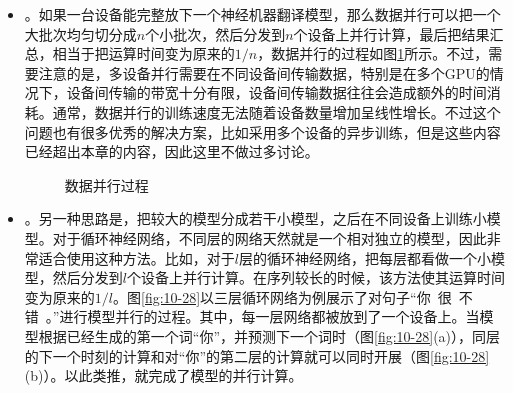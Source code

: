 \begin{itemize}
\vspace{0.5em}

\item {\small{}}。如果一台设备能完整放下一个神经机器翻译模型，那么数据并行可以把一个大批次均匀切分成$n$个小批次，然后分发到$n$个设备上并行计算，最后把结果汇总，相当于把运算时间变为原来的${1}/{n}$，数据并行的过程如图\ref{fig:10-27}所示。不过，需要注意的是，多设备并行需要在不同设备间传输数据，特别是在多个GPU的情况下，设备间传输的带宽十分有限，设备间传输数据往往会造成额外的时间消耗。通常，数据并行的训练速度无法随着设备数量增加呈线性增长。不过这个问题也有很多优秀的解决方案，比如采用多个设备的异步训练，但是这些内容已经超出本章的内容，因此这里不做过多讨论。

\begin{figure}[htp]
\centering

\caption{数据并行过程}
\label{fig:10-27}
\end{figure}

\vspace{0.5em}
\item {\small{}}。另一种思路是，把较大的模型分成若干小模型，之后在不同设备上训练小模型。对于循环神经网络，不同层的网络天然就是一个相对独立的模型，因此非常适合使用这种方法。比如，对于$l$层的循环神经网络，把每层都看做一个小模型，然后分发到$l$个设备上并行计算。在序列较长的时候，该方法使其运算时间变为原来的${1}/{l}$。图\ref{fig:10-28}以三层循环网络为例展示了对句子“你\ 很\ 不错\ 。”进行模型并行的过程。其中，每一层网络都被放到了一个设备上。当模型根据已经生成的第一个词“你”，并预测下一个词时（图\ref{fig:10-28}(a)），同层的下一个时刻的计算和对“你”的第二层的计算就可以同时开展（图\ref{fig:10-28}(b)）。以此类推，就完成了模型的并行计算。
\vspace{0.5em}
\end{itemize}
